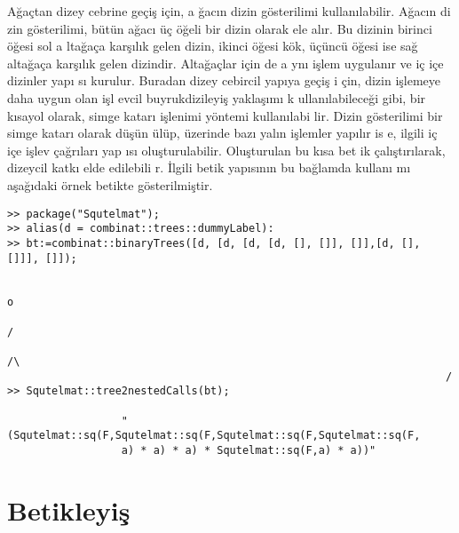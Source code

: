 \documentclass[a4paper,10pt]{article}
\begin{document}
A\u{g}a\c{c}\-tan di\-zey ceb\-rine ge\-\c{c}i\c{s} i\-\c{c}in, a%
\u{g}ac\i n dizin g\"osterilimi kullan\i labilir. A\u{g}ac\i n di%
zin g\"osterilimi, b\"ut\"un a\u{g}ac{\i} \"u\c{c} \"o\-\u{g}eli %
bir dizin olarak ele al\i r. Bu dizinin birinci \"o\u{g}esi sol a%
lta\u{g}a\c{c}a kar\c{s}\i l\i k gelen dizin, ikinci \"o\u{g}esi %
k\"ok, \"u\c{c}\"unc\"u \"o\u{g}esi ise sa\u{g} alta\u{g}a\c{c}a %
kar\c{s}\i l\i k gelen dizindir. Alta\u{g}a\c{c}lar i\c{c}in de a%
yn{\i} i\c{s}lem uygulan\i r ve i\c{c} i\c{c}e dizin\-ler yap{\i}%
s{\i} kurulur. Buradan dizey cebircil yap{\i}\-ya ge\c{c}i\c{s} i%
\c{c}in, di\-zin i\c{s}\-le\-me\-ye da\-ha uy\-gun o\-lan i\c{s}l%
ev\-cil buy\-ruk\-di\-zi\-le\-yi\c{s} yak\-la\-\c{s}{\i}\-m{\i} k%
ul\-la\-n{\i}\-la\-bi\-le\-ce\-\u{g}i gi\-bi, bir k{\i}\-sa\-yol %
o\-la\-rak, simge katar{\i} i\c{s}lenimi y\"ontemi kullan{\i}labi%
lir. Dizin g\"osterilimi bir simge katar{\i} olarak d\"u\c{s}\"un%
\"ul\"up, \"uzerinde baz{\i} yal\i n i\c{s}lemler yap{\i}l\i r is%
e, ilgili i\c{c} i\-\c{c}e i\c{s}\-lev \c{c}a\u{g}r\i lar{\i} yap%
\i s{\i} olu\c{s}turulabilir. O\-lu\c{s}\-tu\-rulan bu k\i sa bet%
ik \c{c}al\i \c{s}t\i r\i larak, dizeycil katk{\i} elde edilebili%
r. \.Ilgili betik yap{\i}s{\i}n{\i}n bu ba\u{g}\-lamda kullan{\i}%
m{\i} a\c{s}a\u{g}\i daki \"ornek betikte g\"osterilmi\c{s}tir. %
\begin{verbatim}
>> package("Squtelmat");
>> alias(d = combinat::trees::dummyLabel):
>> bt:=combinat::binaryTrees([d, [d, [d, [d, [], []], []],[d, [], []]], []]);

                                                                        o
                                                                       /
                                                                      /\
                                                                     /
>> Squtelmat::tree2nestedCalls(bt);

                  "(Squtelmat::sq(F,Squtelmat::sq(F,Squtelmat::sq(F,Squtelmat::sq(F,
                  a) * a) * a) * Squtelmat::sq(F,a) * a))"
\end{verbatim}

\section{Betikleyi\c{s}}
\end{document}
